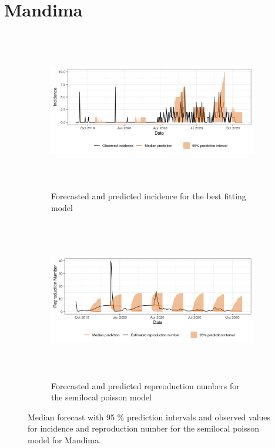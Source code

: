  \section{ Mandima }\begin{figure}[H]\begin{subfigure}{\textwidth}  \centering  \includegraphics[width=0.9\linewidth, height=7cm]{../output/Mandima_predictions.png}  \caption{Forecasted and predicted incidence for the best fitting model}\end{subfigure}

\begin{subfigure}{\textwidth}  \centering  \includegraphics[width=0.9\linewidth, height=7cm]{../output/Mandima_Rs.png}  \caption{Forecasted and predicted repreoduction numbers for the semilocal poisson model}\end{subfigure}  \caption{Median forecast with 95 \% prediction intervals and observed values for incidence and reproduction number for the semilocal poisson model for Mandima.}\end{figure}

